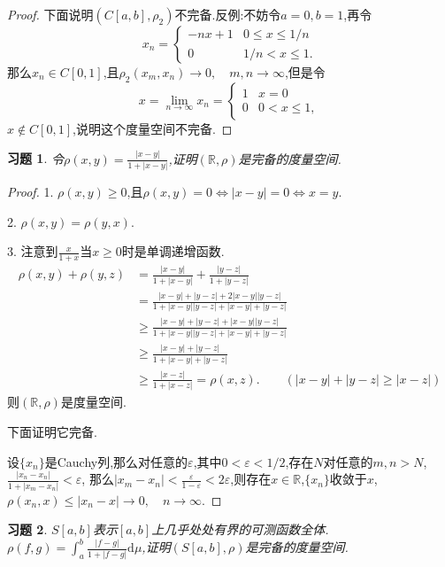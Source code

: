 \documentclass[a4paper,oneside,12pt]{ctexart}
\theoremstyle{plain}
\newtheorem{exercise}{习题}
\theoremstyle{nonumberplain}
\theoremstyle{nonumberplain}
\newtheorem{proof}{证明.}
\newcommand{\dif}{\mathrm{d}}
\newcommand{\R}{\mathbb{R}}
\renewcommand{\epsilon}{\varepsilon}
\newcommand{\abs}[1]{\left\vert#1\right\vert}
\begin{document}
\begin{proof}
    下面说明$(C[a,b],\rho_2)$不完备.反例:不妨令$a=0,b=1$,再令
    $$x_n=\begin{cases}
        -nx+1 & 0\leqslant x\leqslant 1/n\\
        0 & 1/n<x\leqslant 1.
    \end{cases}$$
    那么$x_n\in C[0,1]$,且$\rho_2(x_m,x_n)\to 0,\quad m,n\to \infty$,但是令
    $$x=\lim_{n\to\infty}x_n=\begin{cases}
        1 & x=0\\
        0 & 0<x\leqslant 1,
    \end{cases}$$
    $x\notin C[0,1]$,说明这个度量空间不完备.
\end{proof}

\begin{exercise}
    \label{ex:2}
    令$\rho(x,y)=\frac{\abs{x-y}}{1+\abs{x-y}}$,证明$(\R,\rho)$是完备的度量空间.
\end{exercise}

\begin{proof}
    1. $\rho(x,y)\geqslant 0$,且$\rho(x,y)=0\Leftrightarrow \abs{x-y}=0\Leftrightarrow x=y$.

    2. $\rho(x,y)=\rho(y,x)$.

    3. 注意到$\frac{x}{1+x}$当$x\geqslant 0$时是单调递增函数.\begin{align*}
        \rho(x,y)+\rho(y,z)&=\frac{\abs{x-y}}{1+\abs{x-y}}+\frac{\abs{y-z}}{1+\abs{y-z}}\\
        &=\frac{\abs{x-y}+\abs{y-z}+2\abs{x-y}\abs{y-z}}{1+\abs{x-y}\abs{y-z}+\abs{x-y}+\abs{y-z}}\\
        &\geqslant \frac{\abs{x-y}+\abs{y-z}+\abs{x-y}\abs{y-z}}{1+\abs{x-y}\abs{y-z}+\abs{x-y}+\abs{y-z}}\\
        &\geqslant \frac{\abs{x-y}+\abs{y-z}}{1+\abs{x-y}+\abs{y-z}}\\
        &\geqslant\frac{\abs{x-z}}{1+\abs{x-z}}=\rho(x,z).\qquad (\abs{x-y}+\abs{y-z}\geqslant \abs{x-z})
    \end{align*}
    则$(\R,\rho)$是度量空间.

    下面证明它完备.

    设$\{x_n\}$是Cauchy列,那么对任意的$\epsilon$,其中$0<\epsilon<1/2$,存在$N$对任意的$m,n>N$,$\frac{\abs{x_n-x_n}}{1+\abs{x_m-x_n}}<\epsilon$,
    那么$\abs{x_m-x_n}<\frac{\epsilon}{1-\epsilon}<2\epsilon$,则存在$x\in\R$,$\{x_n\}$收敛于$x$,$\rho(x_n,x)\leqslant \abs{x_n-x}\to 0,\quad n\to\infty$.
\end{proof}

\begin{exercise}
    \label{ex:3}
    $S[a,b]$表示$[a,b]$上几乎处处有界的可测函数全体.$\rho(f,g)=\int_a^b\frac{\abs{f-g}}{1+\abs{f-g}}\dif \mu$,证明$(S[a,b],\rho)$是完备的度量空间.
\end{exercise}
\end{document}
